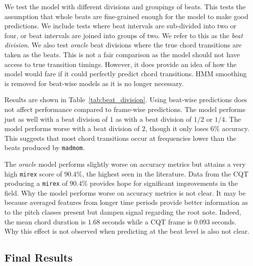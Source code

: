 
We test the model with different divisions and groupings of beats. This tests the assumption that whole beats are fine-grained enough for the model to make good predictions. We include tests where beat intervals are sub-divided into two or four, or beat intervals are joined into groups of two. We refer to this as the \emph{beat division}. We also test \emph{oracle} beat divisions where the true chord transitions are taken as the beats. This is not a fair comparison as the model should not have access to true transition timings. However, it does provide an idea of how the model would fare if it could perfectly predict chord transitions. HMM smoothing is removed for beat-wise models as it is no longer necessary.

Results are shown in Table~\ref{tab:beat_division}. Using beat-wise predictions does not affect performance compared to frame-wise predictions. The model performs just as well with a beat division of $1$ as with a beat division of $1/2$ or $1/4$. The model performs worse with a beat division of $2$, though it only loses $6\%$ accuracy. This suggests that most chord transitions occur at frequencies lower than the beats produced by \texttt{madmom}.

The \emph{oracle} model performs slightly worse on accuracy metrics but attains a very high \texttt{mirex} score of $90.4\%$, the highest seen in the literature. Data from the CQT producing a \texttt{mirex} of $90.4\%$ provides hope for significant improvements in the field. Why the model performs worse on accuracy metrics is not clear. It may be because averaged features from longer time periods provide better information as to the pitch classes present but dampen signal regarding the root note. Indeed, the mean chord duration is $1.68$ seconds while a CQT frame is $0.093$ seconds. Why this effect is not observed when predicting at the beat level is also not clear. 




\subsection{Final Results}\label{sec:test-set}

